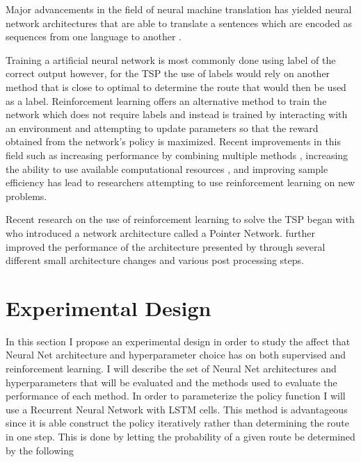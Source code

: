 \documentclass[12pt]{article}
\begin{document}
Major advancements in the field of neural machine translation has yielded neural network architectures that are able to translate a sentences which are encoded as sequences from one language to another \citep{2014_bah}.

Training a artificial neural network is most commonly done using label of the correct output however, for the TSP the use of labels would rely on another method that is close to optimal to determine the route that would then be used as a label. Reinforcement learning offers an alternative method to train the network which does not require labels and instead is trained by interacting with an environment and attempting to update parameters so that the reward obtained from the network's policy is maximized. Recent improvements in this field such as increasing performance by combining multiple methods \citep{2017_Hessel}, increasing the ability to use available computational resources \citep{2016_ga3c}, and improving sample efficiency \citep{2017_Schulman} has lead to researchers attempting to use reinforcement learning on new problems.

Recent research on the use of reinforcement learning to solve the TSP began with \citep{2015_Vinyals} who introduced a network architecture called a Pointer Network. \citep{2016_Bello} further improved the performance of the architecture presented by \citep{2015_Vinyals} through several different small architecture changes and various post processing steps.

%


\section{Experimental Design}
In this section I propose an experimental design in order to study the affect that Neural Net architecture and hyperparameter choice has on both supervised and reinforcement learning. I will describe the set of Neural Net architectures and hyperparameters that will be evaluated and the methods used to evaluate the performance of each method. In order to parameterize the policy function I will use a Recurrent Neural Network with LSTM cells. This method is advantageous since it is able construct the policy iteratively rather than determining the route in one step. This is done by letting the probability of a given route be determined by the following
\end{document}
